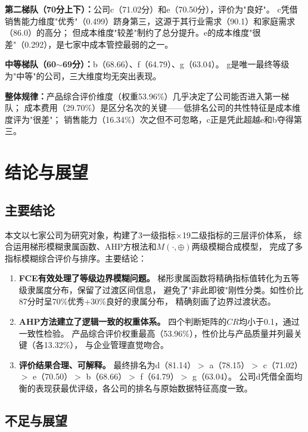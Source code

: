 \documentclass[a4paper,12pt]{ctexart}
\begin{document}
\textbf{第二梯队（70分上下）：}公司c（71.02分）和e（70.50分），评价为"良好"。
c凭借销售能力维度"优秀"（0.499）跻身第三，这源于其行业需求（90.1）和家庭需求（86.0）的高分；
但成本维度"较差"制约了总分提升。e的成本维度"很差"（0.292），是七家中成本管控最弱的之一。

\textbf{中等梯队（60$\sim$69分）：}b（68.66）、f（64.79）、g（63.04）。
g是唯一最终等级为"中等"的公司，三大维度均无突出表现。

\textbf{整体规律：}产品综合评价维度（权重53.96\%）几乎决定了公司能否进入第一梯队；
成本费用（29.70\%）是区分名次的关键——低排名公司的共性特征是成本维度评为"很差"；
销售能力（16.34\%）次之但不可忽略，c正是凭此超越e和b夺得第三。

\section{结论与展望}

\subsection{主要结论}

本文以七家公司为研究对象，构建了3一级指标$\times$19二级指标的三层评价体系，
综合运用梯形模糊隶属函数、AHP方根法和$M(\cdot,\oplus)$两级模糊合成模型，
完成了多指标模糊综合评价与排序。主要结论：

\begin{enumerate}[label=(\arabic*),itemsep=2pt]
    \item \textbf{FCE有效处理了等级边界模糊问题。}
          梯形隶属函数将精确指标值转化为五等级隶属度分布，保留了过渡区间信息，
          避免了"非此即彼"刚性分类。如性价比87分时呈70\%优秀+30\%良好的隶属分布，
          精确刻画了边界过渡状态。
    \item \textbf{AHP方法建立了逻辑一致的权重体系。}
          四个判断矩阵的$CR$均小于0.1，通过一致性检验。
          产品综合评价权重最高（53.96\%），性价比与产品质量并列最关键（各13.32\%），
          与企业管理直觉吻合。
    \item \textbf{评价结果合理、可解释。}
          最终排名为d（81.14）$>$ a（78.15）$>$ c（71.02）$>$ e（70.50）$>$
          b（68.66）$>$ f（64.79）$>$ g（63.04）。
          公司d凭借全面均衡的表现获最优评级，各公司的排名与原始数据特征高度一致。
\end{enumerate}

\subsection{不足与展望}
\end{document}
